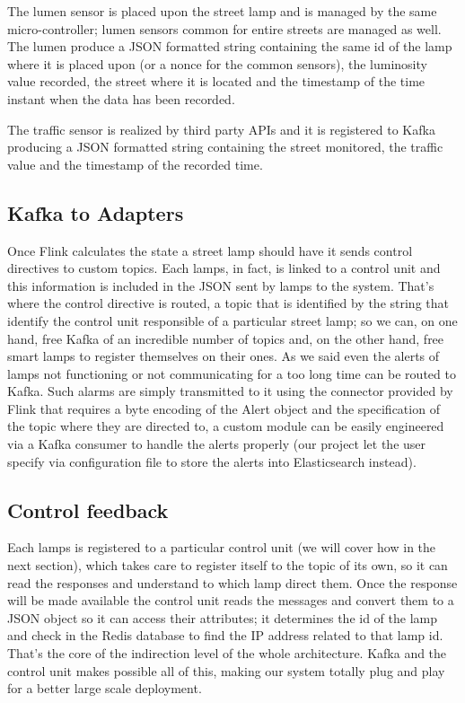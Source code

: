 The lumen sensor is placed upon the street lamp and is managed by the same micro-controller; lumen sensors common for entire streets are managed as well. The lumen produce a JSON formatted string containing the same id of the lamp where it is placed upon (or a nonce for the common sensors), the luminosity value recorded, the street where it is located and the timestamp of the time instant when the data has been recorded.

The traffic sensor is realized by third party APIs and it is registered to Kafka producing a JSON formatted string containing the street monitored, the traffic value and the timestamp of the recorded time.

\subsection{Kafka to Adapters}
Once Flink calculates the state a street lamp should have it sends control directives to custom topics. Each lamps, in fact, is linked to a control unit and this information is included in the JSON sent by lamps to the system. That’s where the control directive is routed, a topic that is identified by the string that identify the control unit responsible of a particular street lamp; so we can, on one hand, free Kafka of an incredible number of topics and, on the other hand, free smart lamps to register themselves on their ones. As we said even the alerts of lamps not functioning or not communicating for a too long time can be routed to Kafka. Such alarms are simply transmitted to it using the connector provided by Flink that requires a byte encoding of the Alert object and the specification of the topic where they are directed to, a custom module can be easily engineered via a Kafka consumer to handle the alerts properly (our project let the user specify via configuration file to store the alerts into Elasticsearch instead).

\subsection{Control feedback}
Each lamps is registered to a particular control unit (we will cover how in the next section), which takes care to register itself to the topic of its own, so it can read the responses and understand to which lamp direct them. Once the response will be made available the control unit reads the messages and convert them to a JSON object so it can access their attributes; it determines the id of the lamp and check in the Redis database to find the IP address related to that lamp id. That’s the core of the indirection level of the whole architecture. Kafka and the control unit makes possible all of this, making our system totally plug and play for a better large scale deployment.


